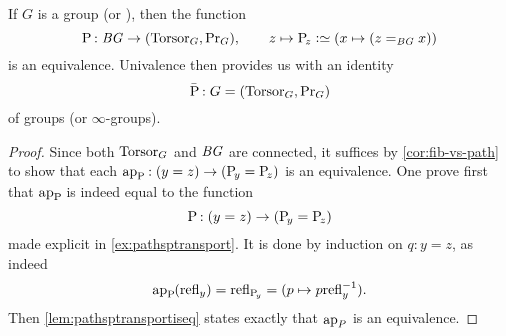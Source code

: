 \begin{theorem}\label{lem:BGbytorsor}
  If $G$ is a group (or \inftygp), then the function
$$\pathsp{}:\BG\to(\typetorsor_G,\princ G),\qquad z\mapsto \pathsp z\defequi(x\mapsto(z=_{\BG}x))$$
is an equivalence.
Univalence then provides us with an identity
$$\bar{\mathrm{P}_{\!}}:G=(\mathrm{Torsor}_G,\mathrm{Pr}_{{G}})$$
of groups (or $\infty$-groups).
\end{theorem}

\begin{proof}
  Since both $\mathrm{Torsor}_G$ and $\mathit{B}\mathit{G}$ are connected, it suffices by
  \cref{cor:fib-vs-path} to show that each
  $\ap {\pathsp{}}:(y=z)\to(\pathsp y=\pathsp z)$ is an
  equivalence. One prove first that $\ap {\pathsp{}}$ is indeed equal
  to the function
  $$\mathrm{P}_{\!}:(y=z)\to(\mathrm{P}_{\!y}= \mathrm{P}_{\!z})$$
  made explicit in \cref{ex:pathsptransport}. It is done by induction
  on $q:y=z$, as indeed
  \begin{displaymath}
    \ap {\pathsp{}}(\refl y) = \refl {\pathsp y} = (p\mapsto p\inv{\refl y}).
  \end{displaymath}
  Then \cref{lem:pathsptransportiseq} states exactly that $\ap P$ is
  an equivalence.
\end{proof}

